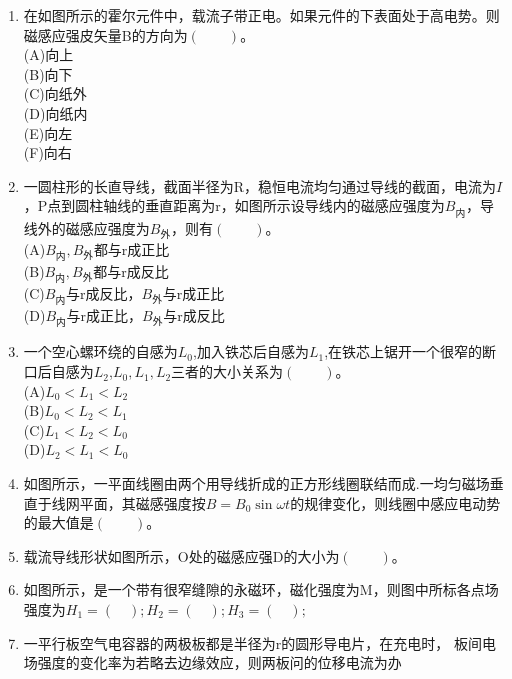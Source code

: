\begin{enumerate}
(A)电流B顺时针,电流C顺时针
(B)电流B逆时针，电流C顺时针
(C)电流B顺时针，电流C逆时针
(D)电流B逆时针，电流C逆时针
(E)B和C中无电流
\item 在如图所示的霍尔元件中，载流子带正电。如果元件的下表面处于高电势。则磁感应强皮矢量B的方向为$(\qquad)$。\\
(A)向上\\
(B)向下\\
(C)向纸外\\
(D)向纸内\\
(E)向左\\
(F)向右
\item 一圆柱形的长直导线，截面半径为R，稳恒电流均匀通过导线的截面，电流为$I$，P点到圆柱轴线的垂直距离为r，如图所示设导线内的磁感应强度为$B_\text{内}$，导线外的磁感应强度为$B_\text{外}$，则有$(\qquad)$。\\
(A)$B_\text{内},B_\text{外}$都与r成正比\\
(B)$B_\text{内},B_\text{外}$都与r成反比\\
(C)$B_\text{内}$与r成反比，$B_\text{外}$与r成正比\\
(D)$B_\text{内}$与r成正比，$B_\text{外}$与r成反比
\item 一个空心螺环绕的自感为$L_0$,加入铁芯后自感为$L_1$,在铁芯上锯开一个很窄的断口后自感为$L_2$,$L_0,L_1,L_2$三者的大小关系为$(\qquad)$。\\
(A)$L_0<L_1<L_2$\\
(B)$L_0<L_2<L_1$\\
(C)$L_1<L_2<L_0$\\
(D)$L_2<L_1<L_0$
\item 如图所示，一平面线圈由两个用导线折成的正方形线圈联结而成.一均匀磁场垂直于线网平面，其磁感强度按$B=B_0\sin \omega t$的规律变化，则线圈中感应电动势的最大值是$(\qquad)$。
\item 载流导线形状如图所示，O处的磁感应强D的大小为$(\qquad)$。
\item 如图所示，是一个带有很窄缝隙的永磁环，磁化强度为M，则图中所标各点场强度为$H_1=(\quad);H_2=(\quad);H_3=(\quad);$
\item 一平行板空气电容器的两极板都是半径为r的圆形导电片，在充电时，
板间电场强度的变化率为若略去边缘效应，则两板问的位移电流为办

\end{enumerate}
